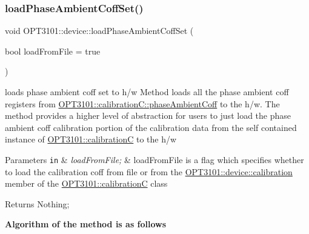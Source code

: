 \subsubsection{\texorpdfstring{load\+Phase\+Ambient\+Coff\+Set()}{loadPhaseAmbientCoffSet()}}
{\footnotesize\ttfamily void O\+P\+T3101\+::device\+::load\+Phase\+Ambient\+Coff\+Set (\begin{DoxyParamCaption}\item[{bool}]{load\+From\+File = {\ttfamily true} }\end{DoxyParamCaption})}



loads phase ambient coff set to h/w Method loads all the phase ambient coff registers from \mbox{\hyperlink{class_o_p_t3101_1_1calibration_c_ab69d912cc3cad353abeb73d7a95b7428}{O\+P\+T3101\+::calibration\+C\+::phase\+Ambient\+Coff}} to the h/w. The method provides a higher level of abstraction for users to just load the phase ambient coff calibration portion of the calibration data from the self contained instance of \mbox{\hyperlink{class_o_p_t3101_1_1calibration_c}{O\+P\+T3101\+::calibrationC}} to the h/w 


\begin{DoxyParams}[1]{Parameters}
\mbox{\tt in}  & {\em load\+From\+File;} & load\+From\+File is a flag which specifies whether to load the calibration coff from file or from the \mbox{\hyperlink{class_o_p_t3101_1_1device_a808c6e99f30fc4f21bee018f351f560d}{O\+P\+T3101\+::device\+::calibration}} member of the \mbox{\hyperlink{class_o_p_t3101_1_1calibration_c}{O\+P\+T3101\+::calibrationC}} class \\
\hline
\end{DoxyParams}
\begin{DoxyReturn}{Returns}
Nothing; 
\end{DoxyReturn}
{\bfseries Algorithm of the method is as follows}


